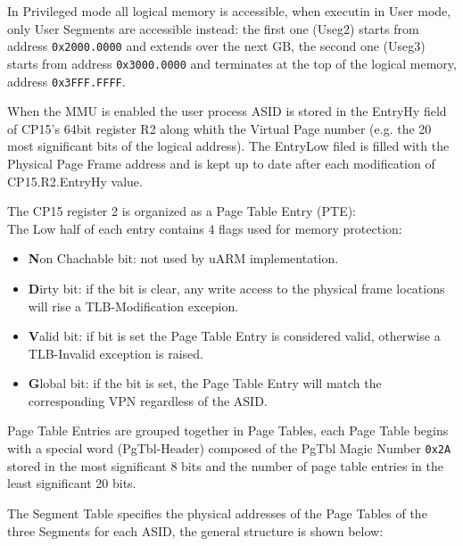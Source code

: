 In Privileged mode all logical memory is accessible, when executin in User mode, only User Segments are accessible instead: the first one (Useg2) starts from address \texttt{0x2000.0000} and extends over the next GB, the second one (Useg3) starts from address \texttt{0x3000.0000} and terminates at the top of the logical memory, address \texttt{0x3FFF.FFFF}.

\vspace{10px}



\vspace{10px}

When the MMU is enabled the user process ASID is stored in the EntryHy field of CP15's 64bit register R2 along whith the Virtual Page number (e.g. the 20 most significant bits of the logical address). The EntryLow filed is filled with the Physical Page Frame address and is kept up to date after each modification of CP15.R2.EntryHy value.

The CP15 register 2 is organized as a Page Table Entry (PTE):
\\



The Low half of each entry contains 4 flags used for memory protection:
\begin{itemize}
\item \textbf{N}on Chachable bit: not used by uARM implementation.
\item \textbf{D}irty bit: if the bit is clear, any write access to the physical frame locations will rise a TLB-Modification excepion.
\item \textbf{V}alid bit: if bit is set the Page Table Entry is considered valid, otherwise a TLB-Invalid exception is raised.
\item \textbf{G}lobal bit: if the bit is set, the Page Table Entry will match the corresponding VPN regardless of the ASID.
\end{itemize}

Page Table Entries are grouped together in Page Tables, each Page Table begins with a special word (PgTbl-Header) composed of the PgTbl Magic Number \texttt{0x2A} stored in the most significant 8 bits and the number of page table entries in the least significant 20 bits.

The Segment Table specifies the physical addresses of the Page Tables of the three Segments for each ASID, the general structure is shown below:
\\

